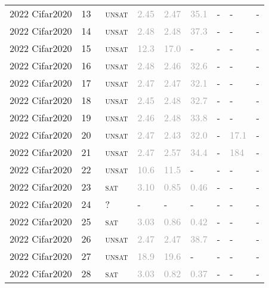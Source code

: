 \begin{center}
{\begin{longtable}{@{}lllllllll@{}}
2022 Cifar2020 & 13 & ~\textsc{unsat} & \textcolor{darkgray}{2.45} & \textcolor{darkgray}{2.47} & \textcolor{darkgray}{35.1} & - & - & - \\
2022 Cifar2020 & 14 & ~\textsc{unsat} & \textcolor{darkgray}{2.48} & \textcolor{darkgray}{2.48} & \textcolor{darkgray}{37.3} & - & - & - \\
2022 Cifar2020 & 15 & ~\textsc{unsat} & \textcolor{darkgray}{12.3} & \textcolor{darkgray}{17.0} & - & - & - & - \\
2022 Cifar2020 & 16 & ~\textsc{unsat} & \textcolor{darkgray}{2.48} & \textcolor{darkgray}{2.46} & \textcolor{darkgray}{32.6} & - & - & - \\
2022 Cifar2020 & 17 & ~\textsc{unsat} & \textcolor{darkgray}{2.47} & \textcolor{darkgray}{2.47} & \textcolor{darkgray}{32.1} & - & - & - \\
2022 Cifar2020 & 18 & ~\textsc{unsat} & \textcolor{darkgray}{2.45} & \textcolor{darkgray}{2.48} & \textcolor{darkgray}{32.7} & - & - & - \\
2022 Cifar2020 & 19 & ~\textsc{unsat} & \textcolor{darkgray}{2.46} & \textcolor{darkgray}{2.48} & \textcolor{darkgray}{33.8} & - & - & - \\
2022 Cifar2020 & 20 & ~\textsc{unsat} & \textcolor{darkgray}{2.47} & \textcolor{darkgray}{2.43} & \textcolor{darkgray}{32.0} & - & \textcolor{darkgray}{17.1} & - \\
2022 Cifar2020 & 21 & ~\textsc{unsat} & \textcolor{darkgray}{2.47} & \textcolor{darkgray}{2.57} & \textcolor{darkgray}{34.4} & - & \textcolor{darkgray}{184} & - \\
2022 Cifar2020 & 22 & ~\textsc{unsat} & \textcolor{darkgray}{10.6} & \textcolor{darkgray}{11.5} & - & - & - & - \\
2022 Cifar2020 & 23 & ~\textsc{sat} & \textcolor{darkgray}{3.10} & \textcolor{darkgray}{0.85} & \textcolor{darkgray}{0.46} & - & - & - \\
2022 Cifar2020 & 24 & ~? & - & - & - & - & - & - \\
2022 Cifar2020 & 25 & ~\textsc{sat} & \textcolor{darkgray}{3.03} & \textcolor{darkgray}{0.86} & \textcolor{darkgray}{0.42} & - & - & - \\
2022 Cifar2020 & 26 & ~\textsc{unsat} & \textcolor{darkgray}{2.47} & \textcolor{darkgray}{2.47} & \textcolor{darkgray}{38.7} & - & - & - \\
2022 Cifar2020 & 27 & ~\textsc{unsat} & \textcolor{darkgray}{18.9} & \textcolor{darkgray}{19.6} & - & - & - & - \\
2022 Cifar2020 & 28 & ~\textsc{sat} & \textcolor{darkgray}{3.03} & \textcolor{darkgray}{0.82} & \textcolor{darkgray}{0.37} & - & - & - \\

\end{longtable}}
\end{center}

